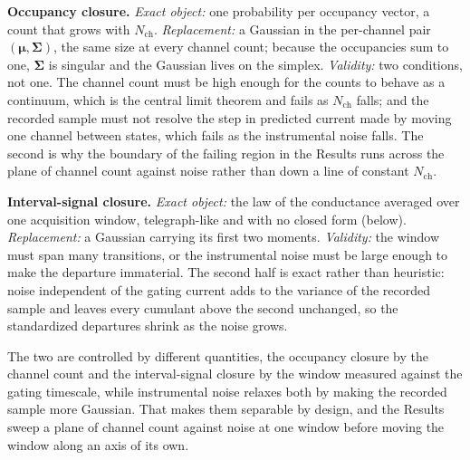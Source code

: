 \begin{tcolorbox}[title={The two Gaussian approximations}, colback=gray!5, colframe=gray!55]
\textbf{Occupancy closure.}
\emph{Exact object:} one probability per occupancy vector, a count that grows with
$N_{\mathrm{ch}}$.
\emph{Replacement:} a Gaussian in the per-channel pair $(\bm{\mu},\bm{\Sigma})$, the same size at
every channel count; because the occupancies sum to one, $\bm{\Sigma}$ is singular and the Gaussian
lives on the simplex.
\emph{Validity:} two conditions, not one. The channel count must be high enough for the counts to
behave as a continuum, which is the central limit theorem and fails as $N_{\mathrm{ch}}$ falls;
and the recorded sample must not resolve the step in predicted current made by moving one channel
between states, which fails as the instrumental noise falls. The second is why the boundary of the
failing region in the Results runs across the plane of channel count against noise rather than
down a line of constant $N_{\mathrm{ch}}$.

\smallskip
\textbf{Interval-signal closure.}
\emph{Exact object:} the law of the conductance averaged over one acquisition window,
telegraph-like and with no closed form (below).
\emph{Replacement:} a Gaussian carrying its first two moments.
\emph{Validity:} the window must span many transitions, or the instrumental noise must be large
enough to make the departure immaterial. The second half is exact rather than heuristic: noise
independent of the gating current adds to the variance of the recorded sample and leaves every
cumulant above the second unchanged, so the standardized departures shrink as the noise grows.

\smallskip
The two are controlled by different quantities, the occupancy closure by the channel count and
the interval-signal closure by the window measured against the gating timescale, while
instrumental noise relaxes both by making the recorded sample more Gaussian. That makes them separable by design, and the Results sweep a
plane of channel count against noise at one window before moving the window along an axis of its
own.
\end{tcolorbox}

